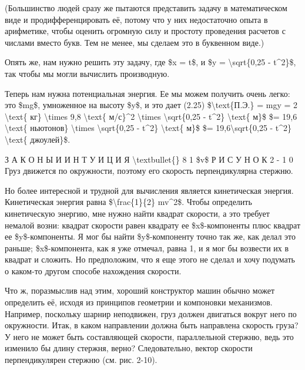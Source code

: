 \documentclass[10pt,oneside]{article}
\begin{document}
(Большинство людей сразу же пытаются представить задачу в математическом виде и продифференцировать её, потому что у них недостаточно опыта в арифметике, чтобы оценить огромную силу и простоту проведения расчетов с числами вместо букв. Тем не менее, мы сделаем это в буквенном виде.)\par

Опять же, нам нужно решить эту задачу, где \$x = t\$, и \$y = \textbackslash{}sqrt\{0,25 - t\textasciicircum{}2\}\$, так чтобы мы могли вычислить производную.\par

Теперь нам нужна потенциальная энергия. Ее мы можем получить очень легко: это \$mg\$, умноженное на высоту \$y\$, и это дает (2.25) \$\textbackslash{}text\{П.Э.\} = mgy = 2 \textbackslash{}text\{ кг\} \textbackslash{}times 9,8 \textbackslash{}text\{ м/с\}\textasciicircum{}2 \textbackslash{}times \textbackslash{}sqrt\{0,25 - t\textasciicircum{}2\} \textbackslash{}text\{ м\}\$ \$= 19,6 \textbackslash{}text\{ ньютонов\} \textbackslash{}times \textbackslash{}sqrt\{0,25 - t\textasciicircum{}2\} \textbackslash{}text\{ м\}\$ \$= 19,6\textbackslash{}sqrt\{0,25 - t\textasciicircum{}2\} \textbackslash{}text\{ джоулей\}\$.\par

З А К О Н Ы  И  И Н Т У И Ц И Я \textbackslash{}textbullet\{\} 8 1 \$v\$ Р И С У Н О К  2 - 1 0 Груз движется по окружности, поэтому его скорость перпендикулярна стержню.\par

Но более интересной и трудной для вычисления является кинетическая энергия. Кинетическая энергия равна \$\textbackslash{}frac\{1\}\{2\} mv\textasciicircum{}2\$. Чтобы определить кинетическую энергию, мне нужно найти квадрат скорости, а это требует немалой возни: квадрат скорости равен квадрату ее \$x\$-компоненты плюс квадрат ее \$y\$-компоненты. Я мог бы найти \$y\$-компоненту точно так же, как делал это раньше; \$x\$-компонента, как я уже отмечал, равна 1, и я мог бы возвести их в квадрат и сложить. Но предположим, что я еще этого не сделал и хочу подумать о каком-то другом способе нахождения скорости.\par

Что ж, поразмыслив над этим, хороший конструктор машин обычно может определить её, исходя из принципов геометрии и компоновки механизмов. Например, поскольку шарнир неподвижен, груз должен двигаться вокруг него по окружности. Итак, в каком направлении должна быть направлена скорость груза? У него не может быть составляющей скорости, параллельной стержню, ведь это изменило бы длину стержня, верно? Следовательно, вектор скорости перпендикулярен стержню (см. рис. 2-10).\par
\end{document}
